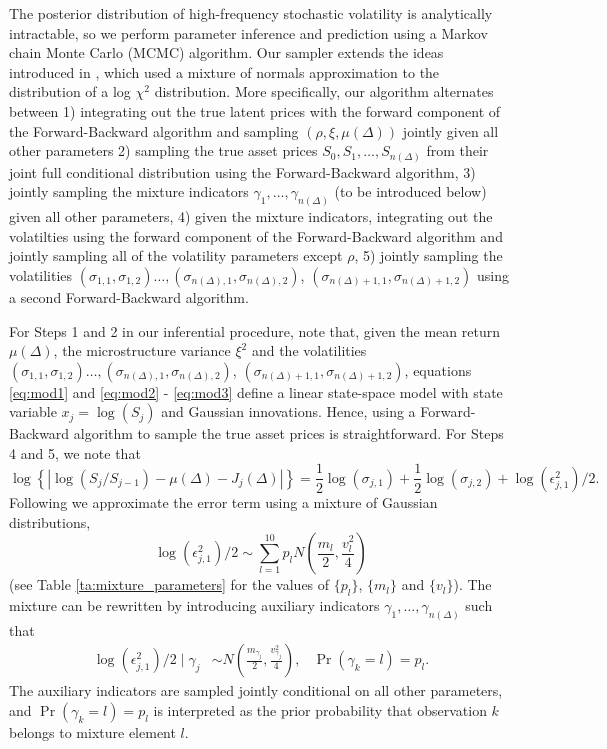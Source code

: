 \documentclass[10pt]{article}
\begin{document}
The posterior distribution of high-frequency stochastic volatility is analytically intractable, so we perform parameter inference and prediction using a Markov chain Monte Carlo (MCMC) algorithm.  Our sampler extends the ideas introduced in \cite{omori2007stochastic}, which used a mixture of normals approximation to the distribution of a log $\chi^2$ distribution.  More specifically, our algorithm alternates between 1) integrating out the true latent prices with the forward component of the Forward-Backward algorithm \citep{carter1994gibbs,fruhwirth1994data} and sampling $(\rho, \xi, \mu(\Delta))$ jointly given all other parameters 2) sampling the true asset prices $S_0, S_1, \ldots, S_{n(\Delta)}$ from their joint full conditional distribution using the Forward-Backward algorithm, 3) jointly sampling the mixture indicators $\gamma_1, \ldots, \gamma_{n(\Delta)}$ (to be introduced below) given all other parameters, 4) given the mixture indicators, integrating out the volatilties using the forward component of the Forward-Backward algorithm and jointly sampling all of the volatility parameters except $\rho$, 5) jointly sampling the volatilities $(\sigma_{1,1},\sigma_{1,2}) \ldots, (\sigma_{n(\Delta),1}, \sigma_{n(\Delta),2})$, $(\sigma_{n(\Delta) + 1,1}, \sigma_{n(\Delta) + 1,2})$ using a second Forward-Backward algorithm.

For Steps 1 and 2 in our inferential procedure, note that, given the mean return $\mu(\Delta)$, the microstructure variance $\xi^2$ and the volatilities $(\sigma_{1,1},\sigma_{1,2}) \ldots, (\sigma_{n(\Delta),1}, \sigma_{n(\Delta),2})$, $(\sigma_{n(\Delta) + 1,1}, \sigma_{n(\Delta) + 1,2})$, equations \eqref{eq:mod1} and \eqref{eq:mod2} - \eqref{eq:mod3} define a linear state-space model with state variable $x_j = \log (S_j)$ and Gaussian innovations.  Hence, using a Forward-Backward algorithm to sample the true asset prices is straightforward.  For Steps 4 and 5, we note that
\[
\log\left\{ | \log(S_j / S_{j -1}) - \mu(\Delta) - J_j(\Delta) | \right\} = \frac{1}{2}\log(\sigma_{j,1}) + \frac{1}{2}\log(\sigma_{j,2}) + \log( \epsilon^2_{j,1} )/2 .
\]
Following \cite{omori2007stochastic} we approximate the error term using a mixture of Gaussian distributions,
$$
\log( \epsilon^2_{j,1} )/2 \sim \sum_{l=1}^{10} p_l N \left( \frac{m_l}{2}, \frac{v_l^2}{4} \right)
$$
(see Table \ref{ta:mixture_parameters} for the values of $\{ p_l \}$, $\{ m_l \}$ and $\{ v_l \}$).  The mixture can be rewritten by introducing auxiliary indicators $\gamma_1, \ldots, \gamma_{n(\Delta)}$ such that
\begin{align*}
\log( \epsilon^2_{j,1} )/2 \mid \gamma_j &\sim N \left( \frac{m_{\gamma_j}}{2}, \frac{v_{\gamma_j}^2}{4} \right)   ,   &   \Pr(\gamma_k = l) = p_l .
\end{align*}
The auxiliary indicators are sampled jointly conditional on all other parameters, and $\Pr(\gamma_k = l) = p_l$ is interpreted as the prior probability that observation $k$ belongs to mixture element $l$.
\end{document}

